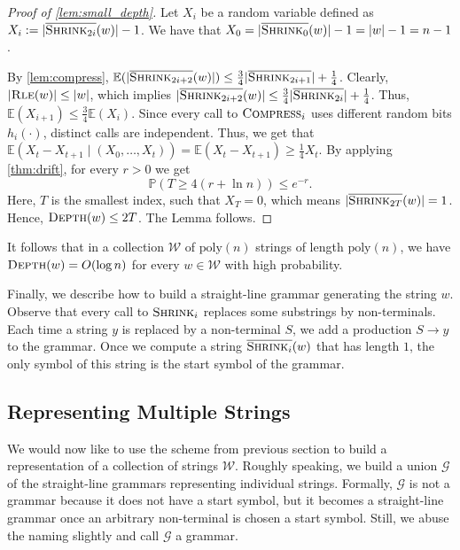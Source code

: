 \documentclass[a4paper]{article}
\theoremstyle{remark}
\newcommand{\compress}{\textsc{Compress}}
\newcommand{\depth}{\textsc{Depth}}
\newcommand{\rle}{\textsc{Rle}}
\newcommand{\shrink}[1]{\ensuremath{\textsc{Shrink}_{#1}}}
\newcommand{\cshrink}[1]{\ensuremath{\overline{\textsc{Shrink}_{#1}}}}
\newcommand{\str}{w}
\newcommand{\strb}{y}
\newcommand{\hs}{h}
\newcommand{\grammar}{\mathcal{G}}
\newcommand{\coll}{\mathcal{W}}
\newcommand{\poly}{\mathrm{poly}}
\begin{document}
\begin{proof}[Proof of \cref{lem:small_depth}]
Let $X_i$ be a random variable defined as $X_i := |\cshrink{2i}(\str)|-1$.
We have that $X_0 = |\cshrink{0}(\str)|-1 = |\str|-1 = n-1$.

By \cref{lem:compress}, $\mathbb{E}(|\cshrink{2i+2}(\str)|) \leq \frac34|\cshrink{2i+1}| + \frac14$.
Clearly, $|\rle(\str)| \leq |\str|$, which implies $|\cshrink{2i+2}(\str)| \leq \frac34|\cshrink{2i}| + \frac14$.
Thus, $\mathbb{E}(X_{i+1}) \leq \frac34 \mathbb{E}(X_i)$.
Since every call to $\compress_i$ uses different random bits $\hs_i(\cdot)$, distinct calls are independent.
Thus,  we get that $\mathbb{E}(X_t - X_{t+1} \mid (X_0, \ldots, X_t)) = \mathbb{E}(X_t - X_{t+1}) \geq \frac14 X_t$.
By applying \cref{thm:drift}, for every $r > 0$ we get
$$\mathbb{P}(T \geq 4(r + \ln n)) \leq e^{-r}.$$
Here, $T$ is the smallest index, such that $X_T = 0$, which means $|\cshrink{2T}(\str)| = 1$.
Hence, $\depth(\str) \leq 2T$.
The Lemma follows.
\end{proof}

It follows that in a collection $\coll$ of $\poly(n)$ strings of length $\poly(n)$, we have $\depth(\str) = O(\log n)$ 
for every $w\in \coll$ with high probability.

Finally, we describe how to build a straight-line grammar generating the string $\str$.
Observe that every call to $\shrink{i}$ replaces some substrings by non-terminals.
Each time a string $\strb$ is replaced by a non-terminal $S$, we add a production $S \rightarrow \strb$ to the grammar.
Once we compute a string $\cshrink{i}(\str)$ that has length $1$, the only symbol of this string is the start symbol of the grammar.

\subsection{Representing Multiple Strings}\label{sec:persistent_ds}
We would now like to use the scheme from previous section to build a representation of a collection of strings $\coll$.
Roughly speaking, we build a union $\grammar$ of the straight-line grammars representing individual strings.
Formally, $\grammar$ is not a grammar because it does not have a start symbol, but it becomes a straight-line grammar once
an arbitrary non-terminal is chosen a start symbol.
Still, we abuse the naming slightly and call $\grammar$ a grammar.
\end{document}
